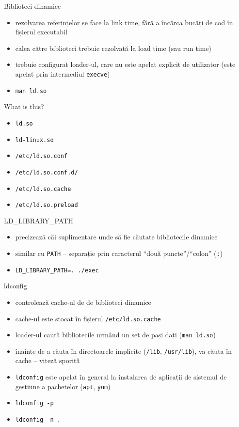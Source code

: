 \documentclass{beamer}
\begin{document}
\begin{frame}{Biblioteci dinamice}
  \begin{itemize}
    \item rezolvarea referințelor se face la link time, fără a încărca bucăți
    de cod în fișierul executabil
    \item calea către biblioteci trebuie rezolvată la load time (sau run time)
    \item trebuie configurat loader-ul, care nu este apelat explicit de
    utilizator (este apelat prin intermediul \texttt{execve})
    \item \texttt{man ld.so}
  \end{itemize}
\end{frame}

\begin{frame}{What is this?}
  \begin{itemize}
    \item \texttt{ld.so}
    \item \texttt{ld-linux.so}
    \item \texttt{/etc/ld.so.conf}
    \item \texttt{/etc/ld.so.conf.d/}
    \item \texttt{/etc/ld.so.cache}
    \item \texttt{/etc/ld.so.preload}
  \end{itemize}
\end{frame}

\begin{frame}{LD\_LIBRARY\_PATH}
  \begin{itemize}
    \item precizează căi suplimentare unde să fie căutate bibliotecile
    dinamice
    \item similar cu \texttt{PATH} -- separație prin caracterul ``două
    puncte''/``colon'' (\texttt{:})
    \item \texttt{LD\_LIBRARY\_PATH=. ./exec}
  \end{itemize}
\end{frame}

\begin{frame}{ldconfig}
  \begin{itemize}
    \item controlează cache-ul de de biblioteci dinamice
    \item cache-ul este stocat în fișierul \texttt{/etc/ld.so.cache}
    \item loader-ul caută bibliotecile urmând un set de pași dați (\texttt{man
    ld.so})
    \item înainte de a căuta în directoarele implicite (\texttt{/lib},
    \texttt{/usr/lib}), va căuta în cache -- viteză sporită
    \item \texttt{ldconfig} este apelat în general la instalarea de aplicații
    de sistemul de gestiune a pachetelor (\texttt{apt}, \texttt{yum})
    \item \texttt{ldconfig -p}
    \item \texttt{ldconfig -n .}
  \end{itemize}
\end{frame}
\end{document}
